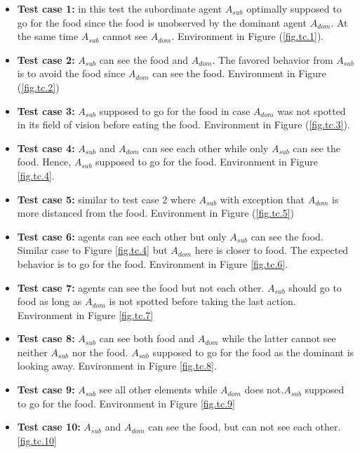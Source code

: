 \documentclass{article}
\begin{document}
\begin{itemize}

\item \textbf {Test case 1:} in this test the subordinate agent \(A_{sub}\) optimally supposed to go for the food since the food is unobserved by the dominant agent \(A_{dom}\). At the same time \(A_{sub}\) cannot see \(A_{dom}\). Environment in Figure (\ref{fig.tc.1}).

\item \textbf {Test case 2:} \(A_{sub}\) can see the food and \(A_{dom}\). The favored behavior from \(A_{sub}\) is to avoid the food since \(A_{dom}\) can see the food. Environment in Figure (\ref{fig.tc.2})

\item \textbf {Test case 3:} \(A_{sub}\) supposed to go for the food in case \(A_{dom}\) was not spotted in its field of vision before eating the food. Environment in Figure (\ref{fig.tc.3}).

\item \textbf {Test case 4:} \(A_{sub}\) and \(A_{dom}\) can see each other while only \(A_{sub}\) can see the food. Hence, \(A_{sub}\) supposed to go for the food. Environment in Figure \ref{fig.tc.4}.

\item \textbf {Test case 5:} similar to test case 2 where \(A_{sub}\) with exception that \(A_{dom}\) is more distanced from the food. Environment in Figure (\ref{fig.tc.5})

\item \textbf {Test case 6:} agents can see each other but only \(A_{sub}\) can see the food. Similar case to Figure \ref{fig.tc.4} but \(A_{dom}\) here is closer to food. The expected behavior is to go for the food. Environment in Figure \ref{fig.tc.6}.

\item \textbf {Test case 7:} agents can see the food but not each other. \(A_{sub}\) should go to food as long as \(A_{dom}\) is not spotted before taking the last action. Environment in Figure \ref{fig.tc.7}

\item \textbf {Test case 8:} \(A_{sub}\) can see both food and \(A_{dom}\) while the latter cannot see neither \(A_{sub}\) nor the food. \(A_{sub}\) supposed to go for the food as the dominant is looking away. Environment in Figure \ref{fig.tc.8}.

\item \textbf {Test case 9:} \(A_{sub}\) see all other elements while \(A_{dom}\) does not.\(A_{sub}\) supposed to go for the food. Environment in Figure \ref{fig.tc.9}

\item \textbf {Test  case 10:} \(A_{sub}\) and \(A_{dom}\) can see the food, but can not see each other.\ref{fig.tc.10}
\end{itemize}
\end{document}
